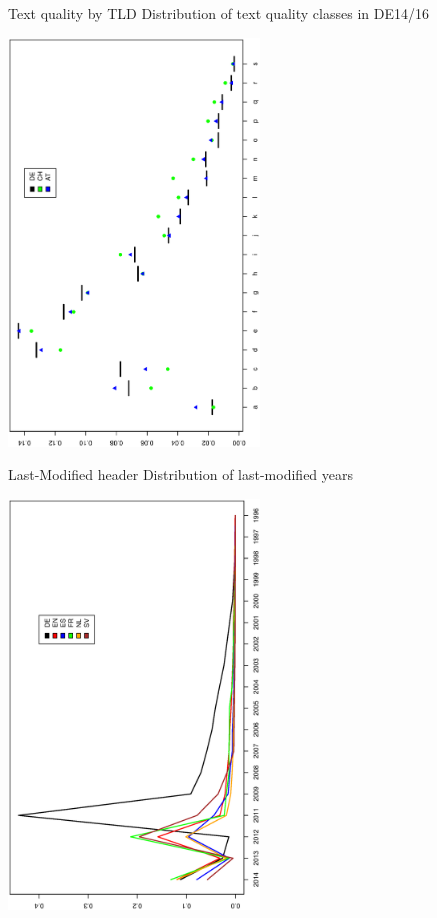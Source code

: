 \begin{frame}
  {Text quality by TLD}
  Distribution of text quality classes in DE14\slash 16\\
  \begin{center}
    \includegraphics[width=0.5\textwidth,angle=270]{graphics/bdh}
  \end{center}
\end{frame}

\begin{frame}
  {Last-Modified header}
  Distribution of last-modified years\\
  \begin{center}
    \includegraphics[width=0.5\textwidth,angle=270]{graphics/lastmod}
  \end{center}
\end{frame}

